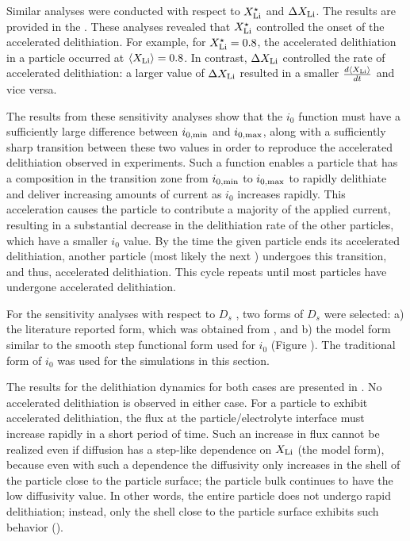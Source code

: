 \documentclass{article}
\begin{document}
Similar analyses were conducted with respect to $X_{\rm{Li}}^{\star}$
and $\Delta X_{\rm{Li}}$. The results are provided in the . These
analyses revealed that $X_{\rm{Li}}^{\star}$ controlled the onset of
the accelerated delithiation. For example, for $X_{\rm{Li}}^{\star} =
0.8$, the accelerated delithiation in a particle occurred at
$\left<X_{\rm{Li}}\right> = 0.8$. In contrast, $\Delta X_{\rm{Li}}$
controlled the rate of accelerated delithiation: a larger value of
$\Delta X_{\rm{Li}}$ resulted in a smaller
$\frac{d\left<X_{\rm{Li}}\right>}{dt}$ and vice versa.

The results from these sensitivity analyses show that the $i_0$
function must have a sufficiently large difference between
$i_{0,\rm{min}}$ and $i_{0,\rm{max}}$, along with a sufficiently sharp
transition between these two values in order to reproduce the
accelerated delithiation observed in experiments. Such a function
enables a particle that has a composition in the transition zone from
$i_{0,\rm{min}}$ to $i_{0,\rm{max}}$ to rapidly delithiate and deliver
increasing amounts of current as $i_0$ increases rapidly. This
acceleration causes the particle to contribute a majority of the
applied current, resulting in a substantial decrease in the
delithiation rate of the other particles, which have a smaller $i_0$
value. By the time the given particle ends its accelerated
delithiation, another particle (most likely the next ) undergoes this transition, and thus, accelerated
delithiation. This cycle repeats until most particles have undergone
accelerated delithiation.


For the sensitivity analyses with respect to $D_s$ , two forms of
$D_s$ were selected: a) the literature reported form, which was
obtained from , and b) the model form similar to
the smooth step functional form used for $i_0$ (Figure ). The traditional form of $i_0$ was used for the simulations in
this section.

The results for the delithiation dynamics for both cases are presented
in . No accelerated delithiation is observed in either
case. For a particle to exhibit accelerated delithiation, the
 flux at the particle/electrolyte interface must increase
rapidly in a short period of time. Such an increase in flux cannot be
realized even if diffusion has a step-like dependence on $X_{\rm{Li}}$
(the model form), because even with such a dependence the diffusivity
only increases in the shell of the particle close to the particle
surface; the particle bulk continues to have the low diffusivity
value. In other words, the entire particle does not undergo rapid
delithiation; instead, only the shell close to the particle surface
exhibits such behavior ().
\end{document}
